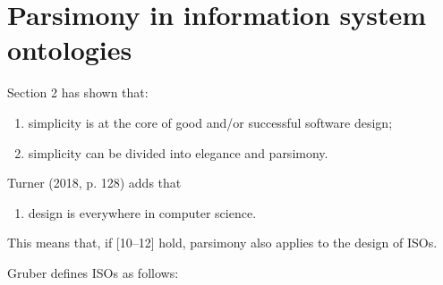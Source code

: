 \section{Parsimony in information system ontologies}

Section 2 has shown that:



\setcounter{saveenum}{\value{enumi}}

\begin{enumerate}

\setcounter{enumi}{\value{saveenum}}

\item simplicity is at the core of good and/or successful software design;

\item simplicity can be divided into elegance and parsimony.

\end{enumerate}

Turner (2018, p. 128) adds that



\setcounter{saveenum}{\value{enumi}}

\begin{enumerate}

\setcounter{enumi}{\value{saveenum}}

\item design is everywhere in computer science.

\end{enumerate}

This means that, if [10–12] hold, parsimony also applies to the design of ISOs.



Gruber 
\parencite*[][]{liu_ontology_2009} %
 defines ISOs as follows:



\setcounter{saveenum}{\value{enumi}}

